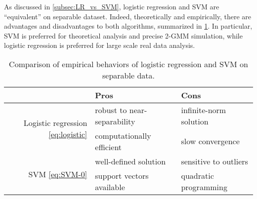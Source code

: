 As discussed in \cref{subsec:LR_vs_SVM}, logistic regression and SVM are ``equivalent'' on separable dataset. Indeed, theoretically and empirically, there are advantages and disadvantages to both algorithms, summarized in \cref{tab:LR_vs_SVM}. In particular, SVM is preferred for theoretical analysis and precise 2-GMM simulation, while logistic regression is preferred for large scale real data analysis.
\begin{table}[h!]
\centering
\begin{tabular}{rll}
    \hline
                 & \textbf{Pros} & \textbf{Cons} \\
    \hline
    \multirow{2}{*}{Logistic regression \eqref{eq:logistic}} 
    & robust to near-separability   & infinite-norm solution \\
    & computationally efficient       & slow convergence \\
    \hline
    \multirow{2}{*}{SVM \eqref{eq:SVM-0}}    
    & well-defined solution     & sensitive to outliers \\
    & support vectors available & quadratic programming \\
    \hline
\end{tabular}
\caption{Comparison of empirical behaviors of logistic regression and SVM on separable data.}
\label{tab:LR_vs_SVM}
\end{table}


